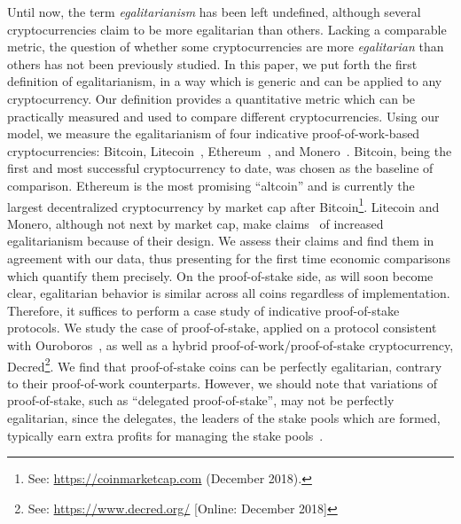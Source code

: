 Until now, the term \emph{egalitarianism} has been left undefined, although
several cryptocurrencies claim to be more egalitarian than others.
Lacking a comparable metric, the question of whether some cryptocurrencies are
more \emph{egalitarian} than others has not been previously studied. In this paper, we
put forth the first definition of egalitarianism, in a way which is
generic and can be applied to any cryptocurrency.
Our definition provides a quantitative metric which can be practically measured and used
to compare different cryptocurrencies.
Using our model, we measure the egalitarianism of
four indicative proof-of-work-based
cryptocurrencies: Bitcoin, Litecoin~\cite{lee2011litecoin}, Ethereum~\cite{wood2014ethereum}, and Monero~\cite{van2013cryptonote}. Bitcoin, being the first and most successful cryptocurrency to date, was chosen as
the baseline of comparison. Ethereum is the most promising ``altcoin'' and is currently the largest decentralized cryptocurrency by market cap after Bitcoin\footnote{See: \url{https://coinmarketcap.com} (December 2018).}.
Litecoin and Monero, although not next by market cap,
make claims~\cite{van2013cryptonote,mcmillan2013} of increased egalitarianism because of their design.
We assess their claims and find them in agreement with our data, thus presenting for the first time economic comparisons which quantify them precisely.
On the proof-of-stake side, as will soon become clear, egalitarian
behavior is similar across all coins regardless of implementation. Therefore,
it suffices to perform a case study of indicative proof-of-stake protocols.
We study the case of proof-of-stake, applied on a protocol consistent with Ouroboros~\cite{C:KRDO17},
as well as a hybrid proof-of-work/proof-of-stake cryptocurrency,
Decred\footnote{See: \url{https://www.decred.org/} [Online: December 2018]}. We find that proof-of-stake coins can be perfectly
egalitarian, contrary to their proof-of-work counterparts. However, we should
note that variations of proof-of-stake, such as ``delegated proof-of-stake'',
may not be perfectly egalitarian, since the delegates, \ie the leaders of
the stake pools which are formed, typically earn extra profits for managing the
stake pools~\cite{stouka-koutsoupias-kiayias}.


